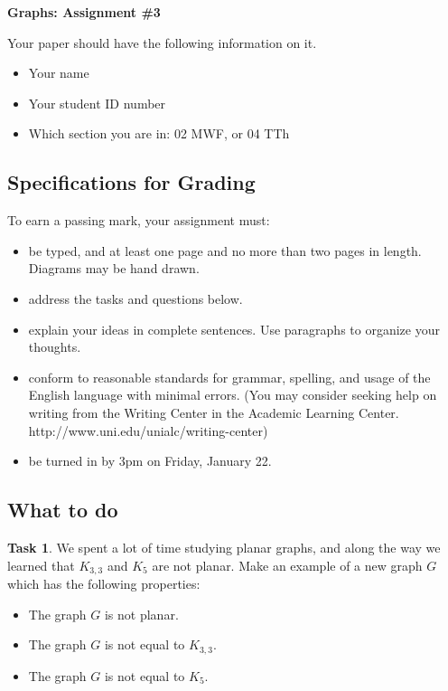 \documentclass[12pt,letterpaper]{article}
\theoremstyle{definition}
\newtheorem{task}{Task}
\begin{document}
\setlength{\parskip}{1ex plus 0.5ex minus 0.2ex}
\setlength{\parindent}{0pt}

\pagestyle{fancy}
\lfoot{} 
\rfoot{} 

\begin{center}
{
\Large
\textbf{Graphs: Assignment \#3}
}
\end{center}

Your paper should have the following information on it.
\begin{itemize}
\item Your name
\item Your student ID number 
\item Which section you are in: 02 MWF, or 04 TTh
\end{itemize}


\subsection*{Specifications for Grading}

To earn a passing mark, your assignment must:
\begin{itemize}
\item be typed, and at least one page and no more than two pages in length. Diagrams may be hand drawn.
\item address the tasks and questions below.
\item explain your ideas in complete sentences. Use paragraphs to organize your thoughts.
\item conform to reasonable standards for grammar, spelling, and usage of the English language with minimal errors. (You may consider seeking help on writing from the Writing Center in the Academic Learning Center. http://www.uni.edu/unialc/writing-center)
\item be turned in by 3pm on Friday, January 22.
\end{itemize}



\subsection*{What to do}

\begin{task}
We spent a lot of time studying planar graphs, and along the way we learned that $K_{3,3}$ and $K_5$ are 
not planar. Make an example of a new graph $G$ which has the following properties:
\begin{itemize}
\item The graph $G$ is not planar.
\item The graph $G$ is not equal to $K_{3,3}$.
\item The graph $G$ is not equal to $K_5$.
\end{itemize}
\end{task}
\end{document}
